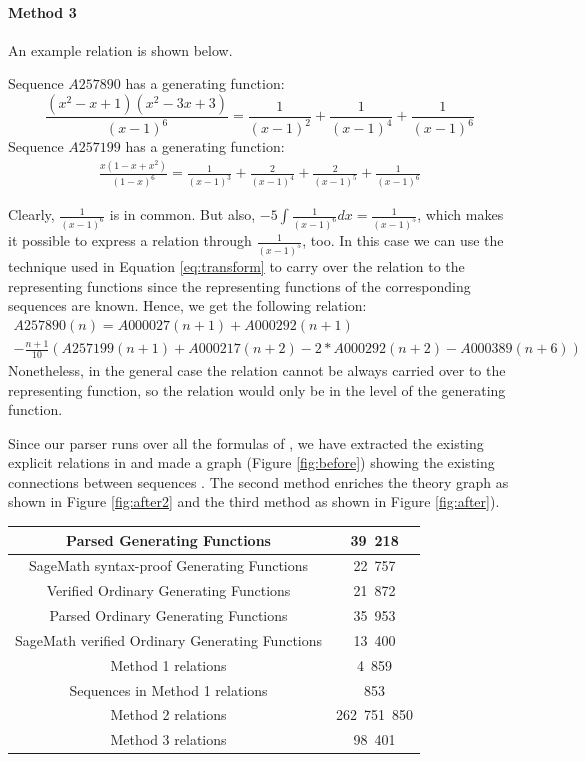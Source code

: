\paragraph{Method 3} An example relation is shown below.

Sequence $A257890$ has a generating function:
\begin{equation}
\frac{(x^2-x+1)(x^2-3x+3)}{(x-1)^6} = \frac{1}{(x - 1)^2} + \frac{1}{(x - 1)^4} + \frac{1}{(x - 1)^6}
\end{equation}
Sequence $A257199$ has a generating function:
\begin{align}
\frac{x(1 - x + x^2)}{(1 - x)^6} = \frac{1}{(x - 1)^3} + \frac{2}{(x - 1)^4} + \frac{2}{(x - 1)^5} + \frac{1}{(x - 1)
^6}
\end{align}

Clearly, $\frac{1}{(x-1)^6}$ is in common. But also, $-5\int \frac{1}{(x-1)^6} dx = \frac{1}{(x-1)^5}$, which makes
it possible to express a relation through $\frac{1}{(x-1)^5}$, too. In this case we can use the technique used in
Equation \ref{eq:transform} to carry over the relation to the representing functions since the representing functions
 of the corresponding sequences are known. Hence, we get the following relation:
\begin{multline}
A257890(n) = A000027(n+1) + A000292(n+1) \\
- \frac{n+1}{10}(A257199(n+1)
 + A000217(n+2) - 2*A000292(n+2) - A000389(n+6))
\end{multline}
Nonetheless, in the general case the relation cannot be always carried over to the representing function, so the
relation would only be in the level of the generating function.

Since our parser runs over all the formulas of \oeis, we have extracted the existing explicit relations in \oeis and
made a graph (Figure \ref{fig:before}) showing the existing connections between sequences .
The second method enriches the theory graph as shown in Figure \ref{fig:after2} and the third method as shown in
Figure \ref{fig:after}).

\begin{center}
 \begin{tabular}{||c | c||}
 \hline
 Parsed Generating Functions & 39\ 218 \\
 \hline
 SageMath syntax-proof Generating Functions & 22\ 757 \\
 \hline
 Verified Ordinary Generating Functions & 21\ 872 \\
 \hline
 Parsed Ordinary Generating Functions &  35\ 953 \\
 \hline
 SageMath verified Ordinary Generating Functions & 13\ 400 \\
 \hline
 Method 1 relations & 4\ 859 \\
 \hline
 Sequences in Method 1 relations & 853 \\
 \hline
 Method 2 relations & 262\ 751\ 850\\
 \hline
 Method 3 relations & 98\ 401 \\
 \hline
\end{tabular}
\end{center}

